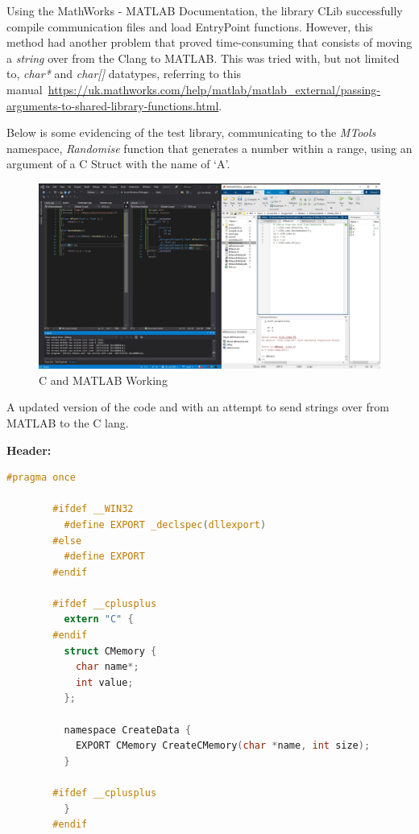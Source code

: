 \documentclass[conference]{IEEEtran}
\begin{document}
      Using the MathWorks - MATLAB Documentation, the library CLib successfully compile communication files and load EntryPoint functions. However, this method had another problem that proved time-consuming that consists of moving a \textit{string} over from the Clang to MATLAB. This was tried with, but not limited to, \textit{char*} and \textit{char[]} datatypes, referring to this manual~\url{https://uk.mathworks.com/help/matlab/matlab_external/passing-arguments-to-shared-library-functions.html}. 

      Below is some evidencing of the test library, communicating to the \textit{MTools} namespace, \textit{Randomise} function that generates a number within a range, using an argument of a C Struct with the name of `A'.
      
      \begin{figure}[ht]
        \centering
        \includegraphics[width=1\columnwidth]{Figures/fig1.jpg}
        \caption{C and MATLAB Working}
        \label{fig:throughput}
      \end{figure}

      A updated version of the code and with an attempt to send strings over from MATLAB to the C lang.

      \textbf{Header:}
      \begin{lstlisting}[language=c]
        #pragma once

        #ifdef __WIN32
          #define EXPORT _declspec(dllexport)
        #else
          #define EXPORT
        #endif

        #ifdef __cplusplus
          extern "C" {
        #endif
          struct CMemory {
            char name*;
            int value;
          };

          namespace CreateData {
            EXPORT CMemory CreateCMemory(char *name, int size);
          }

        #ifdef __cplusplus
          }
        #endif
      \end{lstlisting}
\end{document}
